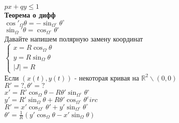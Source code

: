 \documentclass{article}
\newcommand\0{\mathbb{0}}
\newcommand\1{\mathbb{1}}
\renewcommand{\bf}{\textbf}
\begin{document}
$px + qy \leq 1$\\
\bf{Теорема о дифф}\\
$\cos'_\Omega \theta = -\sin_{\Omega^\circ} \theta^\circ$\\
$\sin_\Omega' \theta = \cos_{\Omega^\circ} \theta^\circ$\\
Давайте напишем полярную замену координат\\
$\begin{cases}
    x = R \cos_\Omega \theta\\
    y = R \sin_\Omega \theta\\
    |J| = R
\end{cases}$\\
Если $(x(t), y(t))$ - некоторая кривая на $\mathbb{R}^2 \backslash (0, 0)$\\
$R' = ?, \theta' = ?$\\
$x' = R' \cos_{\Omega}\theta - R\theta' \sin_{\Omega^\circ} \theta^\circ$\\
$y' = R' \sin_\Omega \theta + R \theta' \cos_{\Omega^\circ} \theta^circ$\\
$R' = x' \cos_{\Omega^\circ}\theta' + y' \sin_{\Omega^\circ} \theta^\circ$\\
$\theta' = \frac{1}{R}(y' \cos_\Omega \theta - x' \sin_{\Omega} \theta)$
\end{document}
